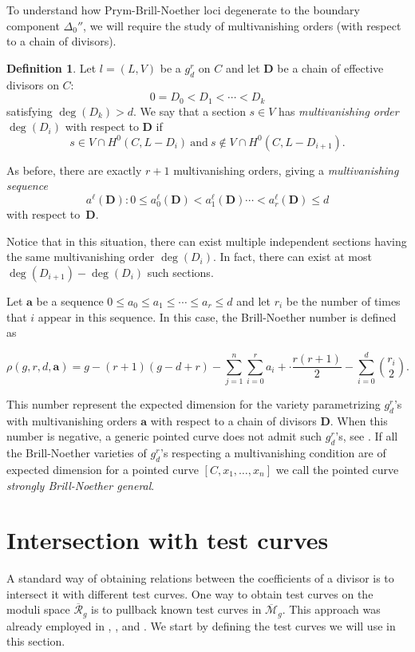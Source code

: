 \documentclass{article}
\theoremstyle{plain}
\theoremstyle{definition}
\newtheorem{defi}[trm]{Definition}
\def\rr{\overline{\mathcal{R}}}
\def\mm{\overline{\mathcal{M}}}
\begin{document}
To understand how Prym-Brill-Noether loci degenerate to the boundary component $\Delta_0''$, we will require the study of multivanishing orders (with respect to a chain of divisors).

\begin{defi}
Let $l = (L, V)$ be a $g^r_d$ on $C$ and let $\textbf{D}$ be a chain of effective divisors on $C$:
\[ 0 = D_0 < D_1 <\cdots < D_k \]
satisfying $\deg(D_k) > d$. We say that a section $s \in V$ has \emph{multivanishing order~$\deg(D_i)$} with respect to $\textbf{D}$ if 
\[ s \in V\cap H^0(C,L-D_i) \ \textrm{and} \ s \not\in V\cap H^0(C,L-D_{i+1}). \]
 
As before, there are exactly $r+1$ multivanishing orders, giving a
\emph{multivanishing sequence}
\[a^{\ell} (\textbf{D}): 0\leq a_0^{\ell}(\textbf{D}) < a_1^{\ell}(\textbf{D})\cdots < a_r^{\ell}(\textbf{D}) \leq d\]
with respect to~$\textbf{D}$.
\end{defi}

Notice that in this situation, there can exist multiple independent sections having the same multivanishing order $\deg(D_i)$. In fact, there can exist at most $\deg(D_{i+1}) - \deg(D_i)$ such sections. 

Let $\textbf{a}$ be a sequence $0\leq a_0 \leq a_1\leq\cdots \leq a_r \leq d$ and let $r_i$ be the number of times that $i$ appear in this sequence. In this case, the Brill-Noether number is defined as 

\[ \rho(g,r,d,\textbf{a}) = g-(r+1)(g-d+r)- \sum_{j=1}^{n}\sum_{i=0}^{r}a_i + \cdot \frac{r(r+1)}{2} - \sum_{i=0}^d \binom{r_i}{2}.\]

This number represent the expected dimension for the variety parametrizing $g^r_d$'s with multivanishing orders $\textbf{a}$ with respect to a chain of divisors $\textbf{D}$. When this number is negative, a generic pointed curve does not admit such $g^r_d$'s, see \cite{Ossermancompacttype}. If all the Brill-Noether varieties of $g^r_d$'s respecting a multivanishing condition are of expected dimension for a pointed curve $[C, x_1,\ldots, x_n]$ we call the pointed curve \textit{strongly Brill-Noether general}.
\section{Intersection with test curves} \label{testintersection}
A standard way of obtaining relations between the coefficients of a divisor is to intersect it with different test curves. One way to obtain test curves on the moduli space $\rr_g$ is to pullback known test curves in $\mm_g$. This approach was already employed in \cite{FarLud}, \cite{Carlos}, \cite{Bud-adm} and \cite{Bud-newdiv}. We start by defining the test curves we will use in this section. 
\end{document}
